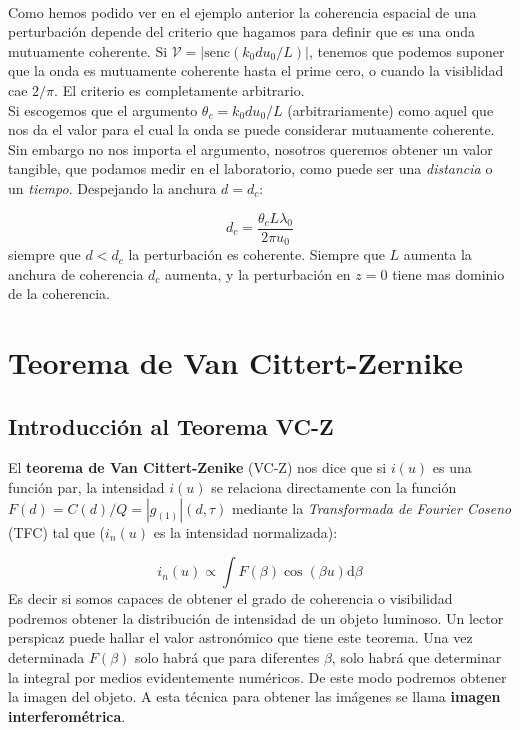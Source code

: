 \documentclass[12pt,a4paper]{book}
\numberwithin{equation}{section}
\numberwithin{figure}{section}
\newcommand{\D}{\mathrm{d}}
\newcommand{\1}{_{(1)}}
\newcommand{\2}{_{(2)}}
\newcommand{\sinc}{\mathrm{senc} }
\theoremstyle{definition}
\begin{document}
\hrulefill \\

Como hemos podido ver en el ejemplo anterior la coherencia espacial de una perturbación depende del criterio que hagamos para definir que es una onda mutuamente coherente. Si $\mathcal{V} = |\sinc (k_0 d u_0 /L)|$, tenemos que podemos suponer que la onda es mutuamente coherente hasta el prime cero, o cuando la visiblidad cae $2/\pi$. El criterio es completamente arbitrario. \\

Si escogemos que el argumento  $\theta_c = k_0 d u_0 /L$ (arbitrariamente) como aquel que nos da el valor para el cual la onda se puede considerar mutuamente coherente. Sin embargo no nos importa el argumento, nosotros queremos obtener un valor tangible, que podamos medir en el laboratorio, como puede ser una \textit{distancia} o un \textit{tiempo}. Despejando la anchura $d=d_c$:

\begin{equation}
d_c = \frac{\theta_c L \lambda_0}{2 \pi u_0}
\end{equation}
siempre que $d<d_c$ la perturbación es coherente. Siempre que $L$ aumenta la anchura de coherencia $d_c$ aumenta, y la perturbación en $z=0$ tiene mas dominio de la coherencia.

\section{Teorema de Van Cittert-Zernike}
\subsection{Introducción al Teorema VC-Z}

El \textbf{teorema de Van Cittert-Zenike} (VC-Z) nos dice que si $i(u)$ es una función par, la intensidad $i(u)$ se relaciona directamente con la función $F(d)=C(d)/Q = |g\1| (d,\tau)$ mediante la \textit{Transformada de Fourier Coseno} (TFC) tal que ($i_n(u)$ es la intensidad normalizada):

\begin{equation}
i_n (u) \varpropto \int F(\beta) \cos (\beta u) \D \beta
\end{equation}
Es decir si somos capaces de obtener el grado de coherencia o visibilidad podremos obtener la distribución de intensidad de un objeto luminoso. Un lector perspicaz puede hallar el valor astronómico que tiene este teorema. Una vez determinada $F(\beta)$ solo habrá que para diferentes $\beta$, solo habrá que determinar la integral por medios evidentemente numéricos. De este modo podremos obtener la imagen del objeto. A esta técnica para obtener las imágenes se llama \textbf{imagen interferométrica}. 
\end{document}
